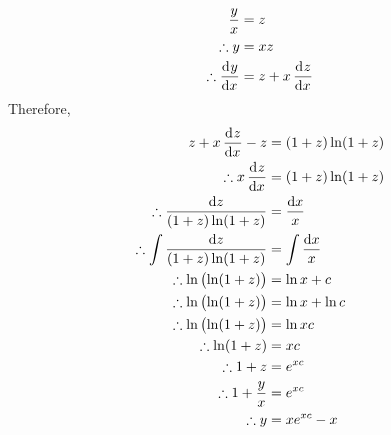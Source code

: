 \documentclass[fleqn, a4paper, 12pt, oneside]{amsart}
\theoremstyle{definition}
\theoremstyle{theorem}
\begin{document}
\begin{solution}
\begin{tasks}
\begin{align*}
				\dfrac{y}{x} &= z\\
				\therefore y &= x z\\
				\therefore \dod{y}{x} &= z + x \dod{z}{x}
			\end{align*}
			Therefore,
			\begin{align*}
				z + x \dod{z}{x} - z &= (1 + z) \ln (1 + z)\\
				\therefore x \dod{z}{x} &= (1 + z) \ln (1 + z)\\
				\therefore \dfrac{\dif z}{(1 + z) \ln (1 + z)} &= \dfrac{\dif x}{x}\\
				\therefore \int \dfrac{\dif z}{(1 + z) \ln (1 + z)} &= \int \dfrac{\dif x}{x}\\
				\therefore \ln \left( \ln (1 + z) \right) &= \ln x + c\\
				\therefore \ln \left( \ln (1 + z) \right) &= \ln x + \ln c\\
				\therefore \ln \left( \ln (1 + z) \right) &= \ln x c\\
				\therefore \ln (1 + z) &= x c\\
				\therefore 1 + z &= e^{x c}\\
				\therefore 1 + \dfrac{y}{x} &= e^{x c}\\
				\therefore y &= x e^{x c} - x
			\end{align*}
	\end{tasks}
\end{solution}
\end{document}
